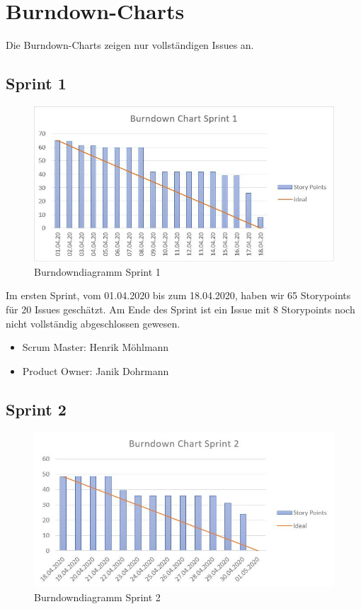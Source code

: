 \chapter{Burndown-Charts}

Die Burndown-Charts zeigen nur vollständigen Issues an.

\section{Sprint 1}

\begin{figure}[H]
	\centering
	\includegraphics[width=\textwidth]{burndown/sprint1.jpg}
	\caption{Burndowndiagramm Sprint 1}
	\label{figure:burndown_sprint1}
\end{figure}

Im ersten Sprint, vom 01.04.2020 bis zum 18.04.2020, haben wir 65 Storypoints für 20 Issues geschätzt. Am Ende des Sprint ist ein Issue mit 8 Storypoints noch nicht vollständig abgeschlossen gewesen.
\begin{itemize}
\item Scrum Master: Henrik Möhlmann
\item Product Owner: Janik Dohrmann
\end{itemize}

\newpage
\section{Sprint 2}

\begin{figure}[H]
	\centering
	\includegraphics[width=\textwidth]{burndown/sprint2.jpg}
	\caption{Burndowndiagramm Sprint 2}
	\label{figure:burndown_sprint2}
\end{figure}

